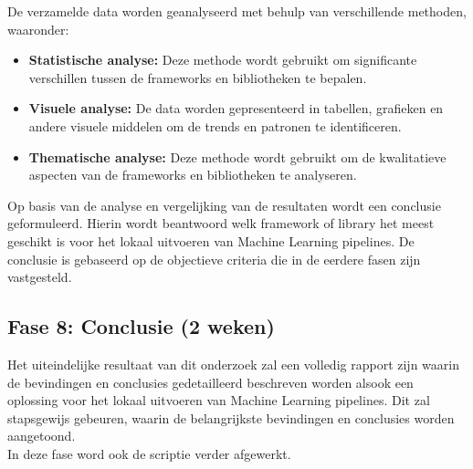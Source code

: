 De verzamelde data worden geanalyseerd met behulp van verschillende methoden, waaronder:
\begin{itemize}
  \item \textbf{Statistische analyse:} Deze methode wordt gebruikt om significante verschillen tussen de frameworks en bibliotheken te bepalen.
  \item \textbf{Visuele analyse:} De data worden gepresenteerd in tabellen, grafieken en andere visuele middelen om de trends en patronen te identificeren.
  \item \textbf{Thematische analyse:}  Deze methode wordt gebruikt om de kwalitatieve aspecten van de frameworks en bibliotheken te analyseren.
\end{itemize}

Op basis van de analyse en vergelijking van de resultaten wordt een conclusie geformuleerd. Hierin wordt beantwoord welk framework of library het meest geschikt is voor het lokaal uitvoeren van Machine Learning pipelines. De conclusie is gebaseerd op de objectieve criteria die in de eerdere fasen zijn vastgesteld.
\subsection{Fase 8: Conclusie (2 weken)}
Het uiteindelijke resultaat van dit onderzoek zal een volledig rapport zijn waarin de bevindingen en conclusies gedetailleerd beschreven worden alsook een oplossing voor het lokaal uitvoeren van Machine Learning pipelines. Dit zal stapsgewijs gebeuren, waarin de belangrijkste bevindingen en conclusies worden aangetoond.\\
In deze fase word ook de scriptie verder afgewerkt.

